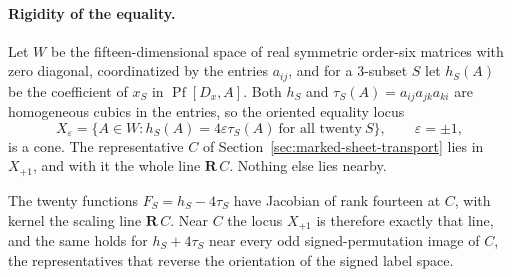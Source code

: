 \paragraph{Rigidity of the equality.}
Let \(W\) be the fifteen-dimensional space of real symmetric order-six matrices
with zero diagonal, coordinatized by the entries \(a_{ij}\), and for a
\(3\)-subset \(S\) let \(h_S(A)\) be the coefficient of \(x_S\) in
\(\operatorname{Pf}[D_x,A]\).  Both \(h_S\) and
\(\tau_S(A)=a_{ij}a_{jk}a_{ki}\) are homogeneous cubics in the entries, so the
oriented equality locus
\[
 X_\varepsilon=\{A\in W:h_S(A)=4\varepsilon\tau_S(A)\ \text{for all twenty}\ S\},
 \qquad\varepsilon=\pm1,
\]
is a cone.  The representative \(C\) of Section~\ref{sec:marked-sheet-transport}
lies in \(X_{+1}\), and with it the whole line \(\mathbf R\,C\).  Nothing else
lies nearby.

\begin{theorem}
\label{thm:conference-equality-rigidity}
The twenty functions \(F_S=h_S-4\tau_S\) have Jacobian of rank fourteen at
\(C\), with kernel the scaling line \(\mathbf R\,C\).  Near \(C\) the locus
\(X_{+1}\) is therefore exactly that line, and the same holds for
\(h_S+4\tau_S\) near every odd signed-permutation image of \(C\), the
representatives that reverse the orientation of the signed label space.
\end{theorem}

